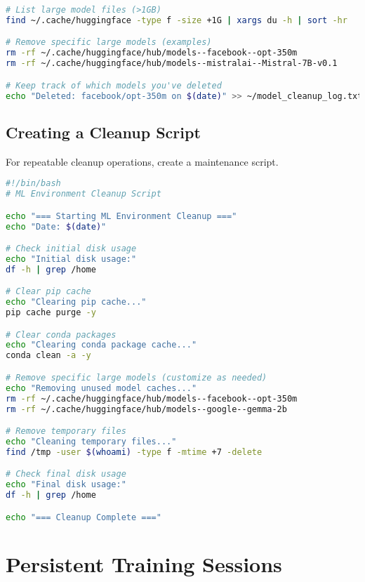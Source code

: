 \documentclass{article}
\begin{document}
\begin{tcolorbox}[colback=red!5!white, colframe=red!75!black, title=LLM Cache Management]
\begin{lstlisting}[language=bash]
# List large model files (>1GB)
find ~/.cache/huggingface -type f -size +1G | xargs du -h | sort -hr

# Remove specific large models (examples)
rm -rf ~/.cache/huggingface/hub/models--facebook--opt-350m
rm -rf ~/.cache/huggingface/hub/models--mistralai--Mistral-7B-v0.1

# Keep track of which models you've deleted
echo "Deleted: facebook/opt-350m on $(date)" >> ~/model_cleanup_log.txt
\end{lstlisting}
\end{tcolorbox}

\subsection{Creating a Cleanup Script}
For repeatable cleanup operations, create a maintenance script.

\begin{tcolorbox}[colback=red!5!white, colframe=red!75!black, title=ML Environment Cleanup Script]
\begin{lstlisting}[language=bash]
#!/bin/bash
# ML Environment Cleanup Script

echo "=== Starting ML Environment Cleanup ==="
echo "Date: $(date)"

# Check initial disk usage
echo "Initial disk usage:"
df -h | grep /home

# Clear pip cache
echo "Clearing pip cache..."
pip cache purge -y

# Clear conda packages
echo "Clearing conda package cache..."
conda clean -a -y

# Remove specific large models (customize as needed)
echo "Removing unused model caches..."
rm -rf ~/.cache/huggingface/hub/models--facebook--opt-350m
rm -rf ~/.cache/huggingface/hub/models--google--gemma-2b

# Remove temporary files
echo "Cleaning temporary files..."
find /tmp -user $(whoami) -type f -mtime +7 -delete

# Check final disk usage
echo "Final disk usage:"
df -h | grep /home

echo "=== Cleanup Complete ==="
\end{lstlisting}
\end{tcolorbox}

\section{Persistent Training Sessions}
\end{document}

